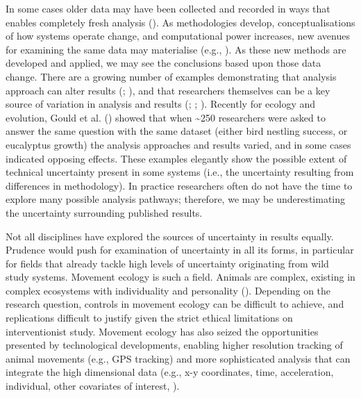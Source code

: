 \documentclass[10pt,a4paper]{article}
\begin{document}
In some cases older data may have been collected and recorded in ways that enables completely fresh analysis ().
As methodologies develop, conceptualisations of how systems operate change, and computational power increases, new avenues for examining the same data may materialise (e.g., ).
As these new methods are developed and applied, we may see the conclusions based upon those data change.
There are a growing number of examples demonstrating that analysis approach can alter results (; ), and that researchers themselves can be a key source of variation in analysis and results (; ; ).
Recently for ecology and evolution, Gould et al. () showed that when \textasciitilde250 researchers were asked to answer the same question with the same dataset (either bird nestling success, or eucalyptus growth) the analysis approaches and results varied, and in some cases indicated opposing effects.
These examples elegantly show the possible extent of technical uncertainty present in some systems (i.e., the uncertainty resulting from differences in methodology).
In practice researchers often do not have the time to explore many possible analysis pathways; therefore, we may be underestimating the uncertainty surrounding published results.

Not all disciplines have explored the sources of uncertainty in results equally.
Prudence would push for examination of uncertainty in all its forms, in particular for fields that already tackle high levels of uncertainty originating from wild study systems.
Movement ecology is such a field.
Animals are complex, existing in complex ecosystems with individuality and personality ().
Depending on the research question, controls in movement ecology can be difficult to achieve, and replications difficult to justify given the strict ethical limitations on interventionist study.
Movement ecology has also seized the opportunities presented by technological developments, enabling higher resolution tracking of animal movements (e.g., GPS tracking) and more sophisticated analysis that can integrate the high dimensional data (e.g., x-y coordinates, time, acceleration, individual, other covariates of interest, ).
\end{document}
